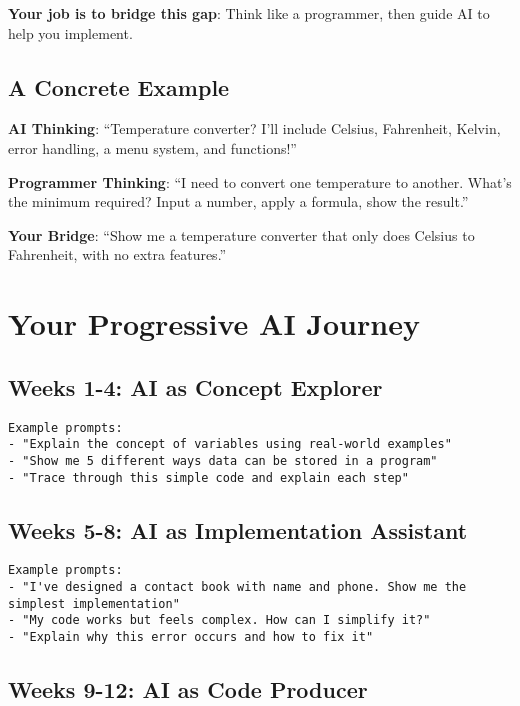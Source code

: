 \documentclass[
  letterpaper,
  DIV=11,
  numbers=noendperiod,
  oneside]{scrreprt}
\begin{document}
\textbf{Your job is to bridge this gap}: Think like a programmer, then
guide AI to help you implement.

\subsection{A Concrete Example}\label{a-concrete-example}

\textbf{AI Thinking}: ``Temperature converter? I'll include Celsius,
Fahrenheit, Kelvin, error handling, a menu system, and functions!''

\textbf{Programmer Thinking}: ``I need to convert one temperature to
another. What's the minimum required? Input a number, apply a formula,
show the result.''

\textbf{Your Bridge}: ``Show me a temperature converter that only does
Celsius to Fahrenheit, with no extra features.''

\section{Your Progressive AI Journey}\label{your-progressive-ai-journey}

\subsection{Weeks 1-4: AI as Concept
Explorer}\label{weeks-1-4-ai-as-concept-explorer}

\begin{verbatim}
Example prompts:
- "Explain the concept of variables using real-world examples"
- "Show me 5 different ways data can be stored in a program"
- "Trace through this simple code and explain each step"
\end{verbatim}

\subsection{Weeks 5-8: AI as Implementation
Assistant}\label{weeks-5-8-ai-as-implementation-assistant}

\begin{verbatim}
Example prompts:
- "I've designed a contact book with name and phone. Show me the simplest implementation"
- "My code works but feels complex. How can I simplify it?"
- "Explain why this error occurs and how to fix it"
\end{verbatim}

\subsection{Weeks 9-12: AI as Code
Producer}\label{weeks-9-12-ai-as-code-producer}
\end{document}
